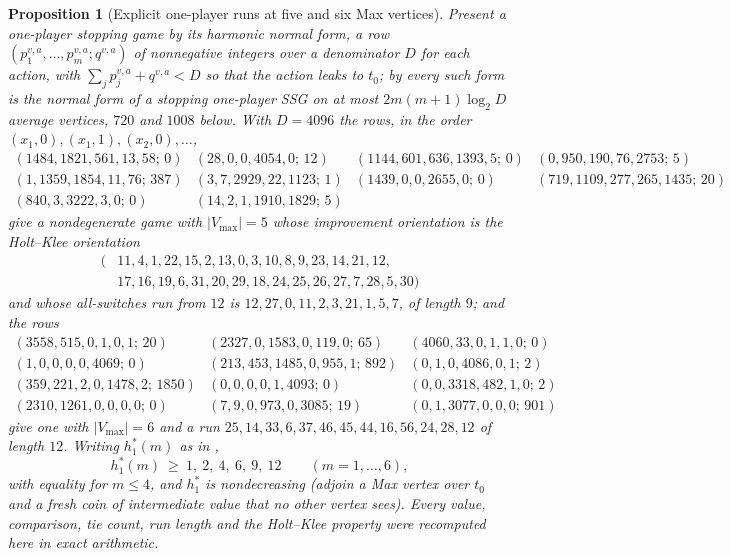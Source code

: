 \documentclass[11pt]{article}
\theoremstyle{plain}
\newtheorem{proposition}[theorem]{Proposition}
\theoremstyle{definition}
\newcommand{\Vmax}{V_{\max}}
\begin{document}
\begin{proposition}[Explicit one-player runs at five and six Max vertices]\label{prop:oneplayer-runs}
Present a one-player stopping game by its harmonic normal form, a row
$(p^{v,a}_1,\dots,p^{v,a}_m;q^{v,a})$ of nonnegative integers over a
denominator $D$ for each action, with $\sum_jp^{v,a}_j+q^{v,a}<D$ so that
the action leaks to $t_0$; by  every such form is the
normal form of a stopping one-player SSG on at most $2m(m+1)\log_2D$
average vertices, $720$ and $1008$ below. With $D=4096$ the rows, in the order $(x_1,0),(x_1,1),(x_2,0),\dots$,
\[
\begin{array}{llll}
(1484,1821,561,13,58;\,0) & (28,0,0,4054,0;\,12) & (1144,601,636,1393,5;\,0) & (0,950,190,76,2753;\,5)\\
(1,1359,1854,11,76;\,387) & (3,7,2929,22,1123;\,1) & (1439,0,0,2655,0;\,0) & (719,1109,277,265,1435;\,20)\\
(840,3,3222,3,0;\,0) & (14,2,1,1910,1829;\,5)
\end{array}
\]
give a nondegenerate game with $|\Vmax|=5$ whose improvement orientation
is the Holt--Klee orientation
\[
\begin{aligned}
 (&11,4,1,22,15,2,13,0,3,10,8,9,23,14,21,12,\\
  &17,16,19,6,31,20,29,18,24,25,26,27,7,28,5,30)
\end{aligned}
\]
and whose all-switches run from $12$ is $12,27,0,11,2,3,21,1,5,7$, of
length $9$; and the rows
\[
\begin{array}{lll}
(3558,515,0,1,0,1;\,20) & (2327,0,1583,0,119,0;\,65) & (4060,33,0,1,1,0;\,0)\\
(1,0,0,0,0,4069;\,0) & (213,453,1485,0,955,1;\,892) & (0,1,0,4086,0,1;\,2)\\
(359,221,2,0,1478,2;\,1850) & (0,0,0,0,1,4093;\,0) & (0,0,3318,482,1,0;\,2)\\
(2310,1261,0,0,0,0;\,0) & (7,9,0,973,0,3085;\,19) & (0,1,3077,0,0,0;\,901)
\end{array}
\]
give one with $|\Vmax|=6$ and a run $25,14,33,6,37,46,45,44,16,56,24,28,12$
of length $12$. Writing $h^{\ast}_{1}(m)$ as in ,
\[
  h^{\ast}_{1}(m)\ \ge\ 1,\ 2,\ 4,\ 6,\ 9,\ 12\qquad(m=1,\dots,6),
\]
with equality for $m\le4$, and $h^{\ast}_{1}$ is nondecreasing (adjoin a
Max vertex over $t_0$ and a fresh coin of intermediate value that no other
vertex sees). Every value, comparison, tie count, run length and the
Holt--Klee property were recomputed here in exact arithmetic.
\end{proposition}
\end{document}
